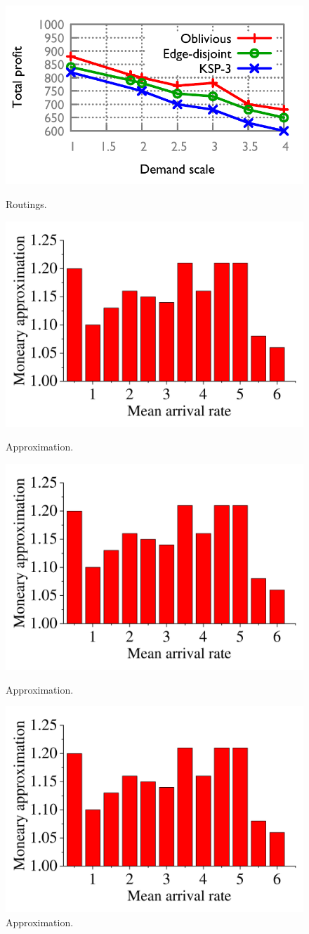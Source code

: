 \documentclass[sigconf]{acmart}
\begin{document}
\begin{figure} 
   \begin{minipage}[t]{0.24\linewidth} 
    \centering 
    \includegraphics[width=1.6 in]{fig/evaluation/routing.pdf}
    \caption{Routings.} 
    \label{routing-version} 
  \end{minipage}%
   \begin{minipage}[t]{0.24\linewidth} 
    \centering 
    \includegraphics[width=1.6 in]{fig/evaluation/approximation.pdf}
    \caption{Approximation.} 
    \label{approximation} 
  \end{minipage}
     \begin{minipage}[t]{0.24\linewidth} 
    \centering 
    \includegraphics[width=1.6 in]{fig/evaluation/approximation.pdf}
    \caption{Approximation.} 
    \label{approximation} 
  \end{minipage}
       \begin{minipage}[t]{0.24\linewidth} 
    \centering 
    \includegraphics[width=1.6 in]{fig/evaluation/approximation.pdf}
    \caption{Approximation.} 
    \label{approximation} 
  \end{minipage}
  
\end{figure}
\end{document}
